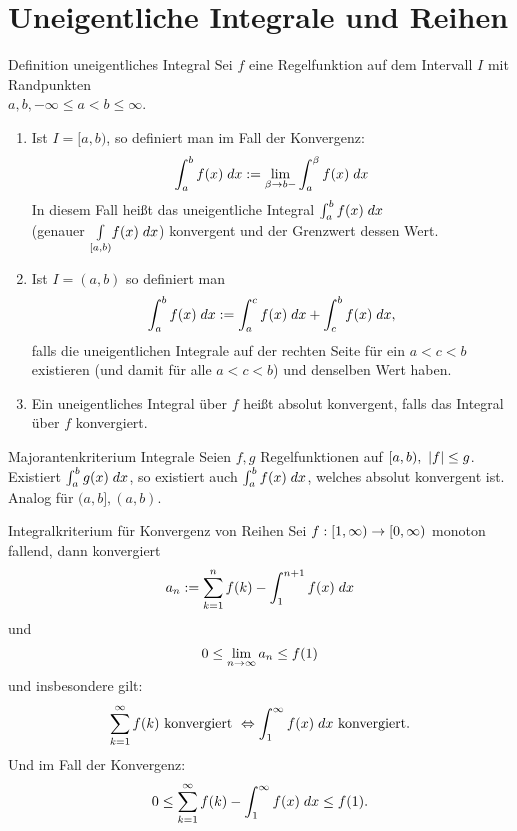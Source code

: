 \documentclass[main.tex]{subfiles}
\begin{document}
\section*{Uneigentliche Integrale und Reihen}

\begin{karte}{Definition uneigentliches Integral}
    Sei \(f\) eine Regelfunktion auf dem Intervall \(I\) 
    mit Randpunkten \\
    \( a, b, -\infty \leq a < b \leq \infty \).
    \begin{enumerate}
        \item Ist \( I=[a,b) \), so definiert man im 
        Fall der Konvergenz:
        \[ \integral{f(x)}{a}{b} 
        := \limesx{\beta}{b-} \integral{f(x)}{a}{\beta} \]
        In diesem Fall heißt das uneigentliche Integral 
        \( \integral{f(x)}{a}{b} \) \\
        (genauer \( \underset{[a,b)}{\int} f(x) \dx \)) konvergent 
        und der Grenzwert dessen Wert.
        \item Ist \( I =(a,b) \) so definiert man
        \[ \integral{f(x)}{a}{b} 
        := \integral{f(x)}{a}{c} 
        + \integral{f(x)}{c}{b}, \]
        falls die uneigentlichen Integrale auf der rechten
        Seite für ein \(a < c < b\) existieren (und damit
        für alle \( a < c < b \)) und denselben Wert haben.
        \item Ein uneigentliches Integral über \(f\) 
        heißt absolut konvergent, falls das Integral 
        über \(f\) konvergiert.
    \end{enumerate}
\end{karte}

\begin{karte}{Majorantenkriterium Integrale}
    Seien \( f,g \) Regelfunktionen auf 
    \( [a,b),\ \abs{f} \leq g \). 
    Existiert \( \integral{g(x)}{a}{b} \), so existiert 
    auch \( \integral{f(x)}{a}{b} \), welches
    absolut konvergent ist.\\
    Analog für \( (a,b], (a,b) \).
\end{karte}

\begin{karte}{Integralkriterium für Konvergenz von Reihen}
    Sei \( \abb{f}{[1,\infty)}{[0,\infty)} \) monoton 
    fallend, dann konvergiert 
    \[ a_n := \sum_{k=1}^n f(k) 
    - \integral{f(x)}{1}{n+1} \]    
    und 
    \[ 0 \leq \limes{n} a_n \leq f(1) \]
    und insbesondere gilt:
    \[ \sum_{k=1}^\infty f(k) \text{ konvergiert }
    \Leftrightarrow \integral{f(x)}{1}{\infty} 
    \text{ konvergiert}. \]
    Und im Fall der Konvergenz:
    \[ 0 \leq \sum_{k=1}^\infty f(k) - \integral{f(x)}{1}{\infty} 
    \leq f(1). \]
\end{karte}
\end{document}

